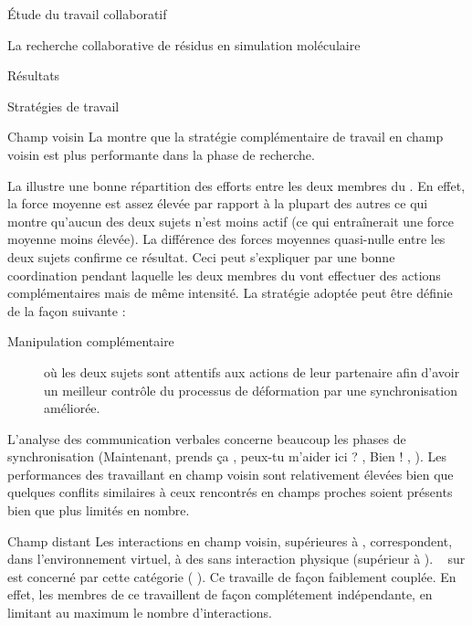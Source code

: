 \documentclass[myfrancais]{mythesis}
\begin{document}
\begin{mypart}{Étude du travail collaboratif}
\begin{mychapter}{La recherche collaborative de résidus en simulation moléculaire}
\begin{mysection}{Résultats}
\begin{mysubsection}{Stratégies de travail}
\begin{mysubsubsection}{Champ voisin}
						La  montre que la stratégie complémentaire de travail en champ voisin est plus performante dans la phase de recherche.

						La  illustre une bonne répartition des efforts entre les deux membres du .
						En effet, la force moyenne est assez élevée par rapport à la plupart des autres  ce qui montre qu'aucun des deux sujets n'est moins actif (ce qui entraînerait une force moyenne moins élevée).
						La différence des forces moyennes quasi-nulle entre les deux sujets confirme ce résultat.
						Ceci peut s'expliquer par une bonne coordination pendant laquelle les deux membres du  vont effectuer des actions complémentaires mais de même intensité.
						La stratégie adoptée peut être définie de la façon suivante :
						\begin{description}
							\item[Manipulation complémentaire] où les deux sujets sont attentifs aux actions de leur partenaire afin d'avoir un meilleur contrôle du processus de déformation par une synchronisation améliorée.
						\end{description}
						L'analyse des communication verbales concerne beaucoup les phases de synchronisation (\og Maintenant, prends ça \fg, \og peux-tu m'aider ici ? \fg, \og Bien ! \fg, \myetc).
						Les performances des  travaillant en champ voisin sont relativement élevées bien que quelques conflits similaires à ceux rencontrés en champs proches soient présents bien que plus limités en nombre.
					\end{mysubsubsection}
					\begin{mysubsubsection}{Champ distant}
						Les interactions en champ voisin, supérieures à , correspondent, dans l'environnement virtuel, à des  sans interaction physique (supérieur à ).
						~ sur  est concerné par cette catégorie ( ).
						Ce  travaille de façon faiblement couplée.
						En effet, les membres de ce  travaillent de façon complétement indépendante, en limitant au maximum le nombre d'interactions.


\end{mysubsubsection}
\end{mysubsection}
\end{mysection}
\end{mychapter}
\end{mypart}
\end{document}
